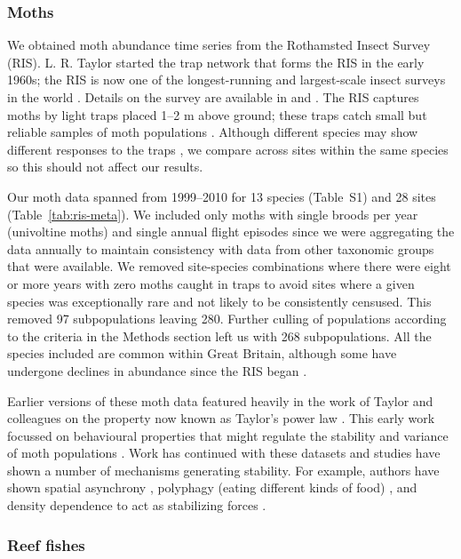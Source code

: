 \subsubsection{Moths}
We obtained moth abundance time series from the Rothamsted Insect Survey
(RIS). L. R. Taylor started the trap network that forms the RIS in the early
1960s; the RIS is now one of the longest-running and largest-scale insect
surveys in the world \citep{conrad2004}. Details on the survey are
available in \citet{conrad2004} and \citet{taylor1986}. The RIS
captures moths by light traps \citep{williams1948} placed 1--2 m above
ground; these traps catch small but reliable samples of moth populations
\citep{williams1948, taylor1974, conrad2004}. Although
different species may show different responses to the traps
\citep{muirhead-thomson1991, woiwod1992}, we compare across sites
within the same species so this should not affect our results.

Our moth data spanned from 1999--2010 for 13 species (Table~S1) and 28 sites
(Table~\ref{tab:ris-meta}). We included only moths with single broods per year
(univoltine moths) and single annual flight episodes since we were aggregating
the data annually to maintain consistency with data from other taxonomic
groups that were available. We removed site-species combinations where there
were eight or more years with zero moths caught in traps to avoid sites where
a given species was exceptionally rare and not likely to be consistently
censused. This removed 97 subpopulations leaving 280. Further culling of
populations according to the criteria in the Methods section left us with 268
subpopulations. All the species included are common within Great Britain,
although some have undergone declines in abundance since the RIS began
\citep{conrad2004}.

Earlier versions of these moth data featured heavily in the work of
Taylor and colleagues on the property now known as Taylor's power law
\citep{taylor1977, taylor1980, perry1981}. This early work
focussed on behavioural properties that might regulate the stability and
variance of moth populations \citep{taylor1980}. Work has continued with
these datasets and studies have shown a number of mechanisms generating
stability. For example, authors have shown spatial asynchrony
\citep{gaston1988}, polyphagy (eating different kinds of food)
\citep{redfearn1988}, and density dependence to act as stabilizing forces
\citep{hanski1993}.

\subsubsection{Reef fishes}

